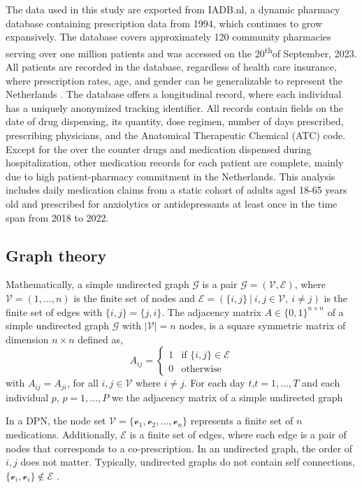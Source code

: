 \documentclass[
  authoryear,
  review]{elsarticle}
\begin{document}
The data used in this study are exported from IADB.nl, a dynamic pharmacy database containing prescription data from 1994, which continues to grow expansively. The database covers approximately 120 community pharmacies serving over one million patients and was accessed on the 20\textsuperscript{th}of September, 2023. All patients are recorded in the database, regardless of health care insurance, where prescription rates, age, and gender can be generalizable to represent the Netherlands \citep{Visser2013}. The database offers a longitudinal record, where each individual has a uniquely anonymized tracking identifier. All records contain fields on the date of drug dispensing, its quantity, dose regimen, number of days prescribed, prescribing physicians, and the Anatomical Therapeutic Chemical (ATC) code. Except for the over the counter drugs and medication dispensed during hospitalization, other medication records for each patient are complete, mainly due to high patient-pharmacy commitment in the Netherlands. This analysis includes daily medication claims from a static cohort of adults aged 18-65 years old and prescribed for anxiolytics or antidepressants at least once in the time span from 2018 to 2022.

\subsection{Graph theory}\label{graph-theory}

Mathematically, a simple undirected graph \(\mathcal{G}\) is a pair
\(\mathcal{G} = (\mathcal{V}, \mathcal{E})\), where \(\mathcal{V}=\left(1,\dots,n \right)\) is the finite set of nodes and \(\mathcal{E}=\left(\{i,j\} \ |\ i,j\in \mathcal{V},\ i\neq j \right)\) is the finite set of edges with \(\{i,j\}=\{j,i\}\). The adjacency matrix $A\in \{0,1\}^{n\times n}$ of a simple undirected graph \(\mathcal{G}\) with \(|\mathcal{V}|=n\) nodes, is a square symmetric matrix of dimension \(n\times n\) defined as, \[
A_{ij} = 
\begin{cases}
1 & \text{if } \{i, j\} \in \mathcal{E} \\
0 & \text{otherwise}
\end{cases}
\] with \( A_{ij} = A_{ji} \), for all \( i, j \in  \mathcal{V}\) where $i\neq j$. For each day $t$,$t=1,\dots,T$ and each individual $p$, $p=1,\dots,P$ we the adjacency matrix of a simple undirected graph 





In a DPN, the
node set
\(\mathcal{V} = \{\mathcal{v}_1, \mathcal{v}_2, \dots, \mathcal{v}_n\}\)
represents a finite set of \(n\) medications. Additionally,
\(\mathcal{E}\) is a finite set of edges, where each edge is a pair of
nodes that corresponds to a co-prescription. In an undirected graph, the
order of \(i, j\) does not matter. Typically, undirected graphs do not
contain self connections,
\(\{\mathcal{v}_i, \mathcal{v}_i\} \notin \mathcal{E}\)
\citep{estrada2012structure}.
\end{document}
